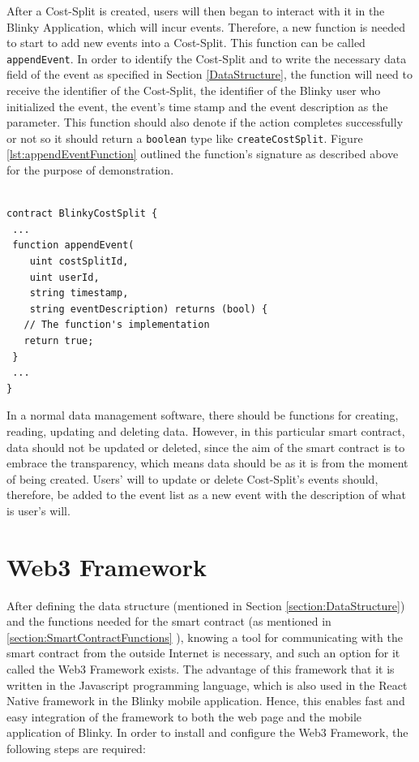 \documentclass[twoside,draftfooter]{tutthesis} %
\begin{document}
After a Cost-Split is created, users will then began to interact with it in the Blinky Application, which will incur events. Therefore, a new function is needed to start to add new events into a Cost-Split. This function can be called \texttt{appendEvent}. In order to identify the Cost-Split and to write the necessary data field of the event as specified in Section \ref{DataStructure}, the function will need to receive the identifier of the Cost-Split, the identifier of the Blinky user who initialized the event, the event's time stamp and the event description as the parameter. This function should also denote if the action completes successfully or not so it should return a \texttt{boolean} type like \texttt{createCostSplit}. Figure \ref{lst:appendEventFunction} outlined the function's signature as described above for the purpose of demonstration.

\begin{lstlisting}[float,caption={Skeleton implementation of function \texttt{appendEvent}.},label={lst:appendEventFunction},language=Solidity]

contract BlinkyCostSplit {
 ...
 function appendEvent(
    uint costSplitId,
    uint userId,
    string timestamp,
    string eventDescription) returns (bool) {
   // The function's implementation
   return true;
 }
 ...
}

\end{lstlisting}

In a normal data management software, there should be functions for creating, reading, updating and deleting data. However, in this particular smart contract, data should not be updated or deleted, since the aim of the smart contract is to embrace the transparency, which means data should be as it is from the moment of being created. Users' will to update or delete Cost-Split's events should, therefore, be added to the event list as a new event with the description of what is user's will.

\section{Web3 Framework}

After defining the data structure (mentioned in Section \ref{section:DataStructure}) and the functions needed for the smart contract (as mentioned in \ref{section:SmartContractFunctions} ), knowing a tool for communicating with the smart contract from the outside Internet is necessary, and such an option for it called the Web3 Framework exists. The advantage of this framework that it is written in the Javascript programming language, which is also used in the React Native framework in the Blinky mobile application. Hence, this enables fast and easy integration of the framework to both the web page and the mobile application of Blinky. In order to install and configure the Web3 Framework, the following steps are required:
\end{document}
